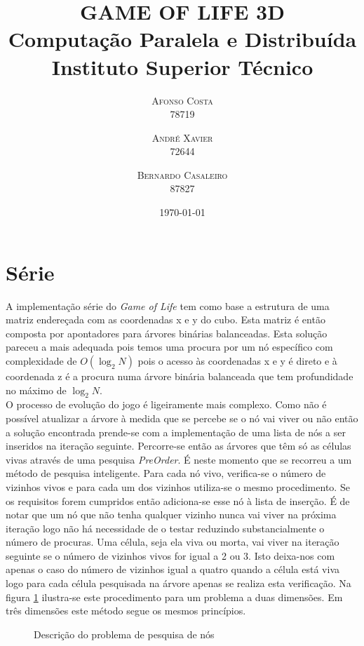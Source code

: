 \documentclass[twoside,twocolumn]{article}
\title{GAME OF LIFE 3D\\\large{Computação Paralela e Distribuída}\\Instituto Superior Técnico} %
\author{%
\textsc{Afonso Costa}%
\\%
\normalsize 78719 %
\and %
\textsc{André Xavier}%
\\%
\normalsize 72644 %
\and %
\textsc{Bernardo Casaleiro}%
\\%
\normalsize 87827 %
}
\date{\today} %
\begin{document}
\maketitle

\section{Série}

A implementação série do \textit{Game of Life} tem como base a estrutura de uma matriz endereçada com as coordenadas x e y do cubo. Esta matriz é então composta por apontadores para árvores binárias balanceadas. Esta solução pareceu a mais adequada pois temos uma procura por um nó específico com complexidade de $O(\log_2 N)$ pois o acesso às coordenadas x e y é direto e à coordenada z é a procura numa árvore binária balanceada que tem profundidade no máximo de $\log_2 N$. \\

O processo de evolução do jogo é ligeiramente mais complexo. Como não é possível atualizar a árvore à medida que se percebe se o nó vai viver ou não então a solução encontrada prende-se com a implementação de uma lista de nós a ser inseridos na iteração seguinte. Percorre-se então as árvores que têm só as células vivas através de uma pesquisa \textit{PreOrder}. É neste momento que se recorreu a um método de pesquisa inteligente. Para cada nó vivo, verifica-se o número de vizinhos vivos e para cada um dos vizinhos utiliza-se o mesmo procedimento. Se os requisitos forem cumpridos então adiciona-se esse nó à lista de inserção. É de notar que um nó que não tenha qualquer vizinho nunca vai viver na próxima iteração logo não há necessidade de o testar reduzindo substancialmente o número de procuras. Uma célula, seja ela viva ou morta, vai viver na iteração seguinte se o número de vizinhos vivos for igual a 2 ou 3. Isto deixa-nos com apenas o caso do número de vizinhos igual a quatro quando a célula está viva logo para cada célula pesquisada na árvore apenas se realiza esta verificação. Na figura \ref{search} ilustra-se este procedimento para um problema a duas dimensões. Em três dimensões este método segue os mesmos princípios.

\begin{figure}[H]
    \centering
    \caption{Descrição do problema de pesquisa de nós}
    \label{search}
\end{figure}
\end{document}
